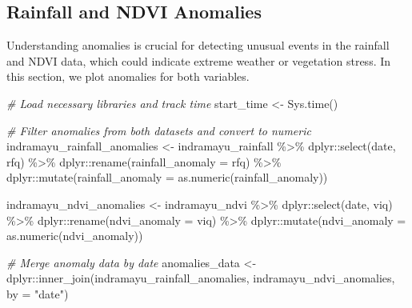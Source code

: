 \documentclass[
]{article}
\newenvironment{Shaded}{}{}
\newcommand{\AttributeTok}[1]{\textcolor[rgb]{0.49,0.56,0.16}{#1}}
\newcommand{\CommentTok}[1]{\textcolor[rgb]{0.38,0.63,0.69}{\textit{#1}}}
\newcommand{\FunctionTok}[1]{\textcolor[rgb]{0.02,0.16,0.49}{#1}}
\newcommand{\NormalTok}[1]{#1}
\newcommand{\OtherTok}[1]{\textcolor[rgb]{0.00,0.44,0.13}{#1}}
\newcommand{\SpecialCharTok}[1]{\textcolor[rgb]{0.25,0.44,0.63}{#1}}
\newcommand{\StringTok}[1]{\textcolor[rgb]{0.25,0.44,0.63}{#1}}
\begin{document}
\subsection{Rainfall and NDVI
Anomalies}\label{rainfall-and-ndvi-anomalies}

Understanding anomalies is crucial for detecting unusual events in the
rainfall and NDVI data, which could indicate extreme weather or
vegetation stress. In this section, we plot anomalies for both
variables.

\begin{Shaded}
\begin{Highlighting}[]
\CommentTok{\# Load necessary libraries and track time}
\NormalTok{start\_time }\OtherTok{\textless{}{-}} \FunctionTok{Sys.time}\NormalTok{()}

\CommentTok{\# Filter anomalies from both datasets and convert to numeric}
\NormalTok{indramayu\_rainfall\_anomalies }\OtherTok{\textless{}{-}}\NormalTok{ indramayu\_rainfall }\SpecialCharTok{\%\textgreater{}\%}
\NormalTok{  dplyr}\SpecialCharTok{::}\FunctionTok{select}\NormalTok{(date, rfq) }\SpecialCharTok{\%\textgreater{}\%}
\NormalTok{  dplyr}\SpecialCharTok{::}\FunctionTok{rename}\NormalTok{(}\AttributeTok{rainfall\_anomaly =}\NormalTok{ rfq) }\SpecialCharTok{\%\textgreater{}\%}
\NormalTok{  dplyr}\SpecialCharTok{::}\FunctionTok{mutate}\NormalTok{(}\AttributeTok{rainfall\_anomaly =} \FunctionTok{as.numeric}\NormalTok{(rainfall\_anomaly))}

\NormalTok{indramayu\_ndvi\_anomalies }\OtherTok{\textless{}{-}}\NormalTok{ indramayu\_ndvi }\SpecialCharTok{\%\textgreater{}\%}
\NormalTok{  dplyr}\SpecialCharTok{::}\FunctionTok{select}\NormalTok{(date, viq) }\SpecialCharTok{\%\textgreater{}\%}
\NormalTok{  dplyr}\SpecialCharTok{::}\FunctionTok{rename}\NormalTok{(}\AttributeTok{ndvi\_anomaly =}\NormalTok{ viq) }\SpecialCharTok{\%\textgreater{}\%}
\NormalTok{  dplyr}\SpecialCharTok{::}\FunctionTok{mutate}\NormalTok{(}\AttributeTok{ndvi\_anomaly =} \FunctionTok{as.numeric}\NormalTok{(ndvi\_anomaly))}

\CommentTok{\# Merge anomaly data by date}
\NormalTok{anomalies\_data }\OtherTok{\textless{}{-}}\NormalTok{ dplyr}\SpecialCharTok{::}\FunctionTok{inner\_join}\NormalTok{(indramayu\_rainfall\_anomalies, }
\NormalTok{                                    indramayu\_ndvi\_anomalies, }
                                    \AttributeTok{by =} \StringTok{"date"}\NormalTok{)}


\end{Highlighting}
\end{Shaded}
\end{document}
